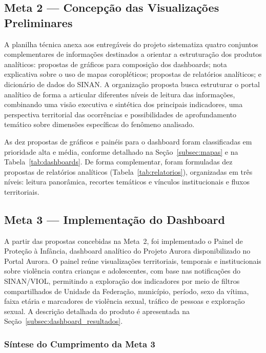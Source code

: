 \documentclass[11pt,a4paper]{article}
\begin{document}
\subsection{Meta 2 — Concepção das Visualizações Preliminares}
\label{subsec:atividades_meta2}

A planilha técnica anexa aos entregáveis do projeto sistematiza quatro conjuntos complementares de informações destinados a orientar a estruturação dos produtos analíticos: propostas de gráficos para composição dos dashboards; nota explicativa sobre o uso de mapas coropléticos; propostas de relatórios analíticos; e dicionário de dados do SINAN. A organização proposta busca estruturar o portal analítico de forma a articular diferentes níveis de leitura das informações, combinando uma visão executiva e sintética dos principais indicadores, uma perspectiva territorial das ocorrências e possibilidades de aprofundamento temático sobre dimensões específicas do fenômeno analisado.

As dez propostas de gráficos e painéis para o dashboard foram classificadas em prioridade alta e média, conforme detalhado na Seção~\ref{subsec:mapas} e na Tabela~\ref{tab:dashboards}. De forma complementar, foram formuladas dez propostas de relatórios analíticos (Tabela~\ref{tab:relatorios}), organizadas em três níveis: leitura panorâmica, recortes temáticos e vínculos institucionais e fluxos territoriais.

\subsection{Meta 3 — Implementação do Dashboard}
\label{subsec:atividades_meta3}

A partir das propostas concebidas na Meta~2, foi implementado o Painel de Proteção à Infância, dashboard analítico do Projeto Aurora disponibilizado no Portal Aurora. O painel reúne visualizações territoriais, temporais e institucionais sobre violência contra crianças e adolescentes, com base nas notificações do SINAN/VIOL, permitindo a exploração dos indicadores por meio de filtros compartilhados de Unidade da Federação, município, período, sexo da vítima, faixa etária e marcadores de violência sexual, tráfico de pessoas e exploração sexual. A descrição detalhada do produto é apresentada na Seção~\ref{subsec:dashboard_resultados}.

\subsubsection{Síntese do Cumprimento da Meta 3}
\label{sec:sintese_meta3}
\end{document}
